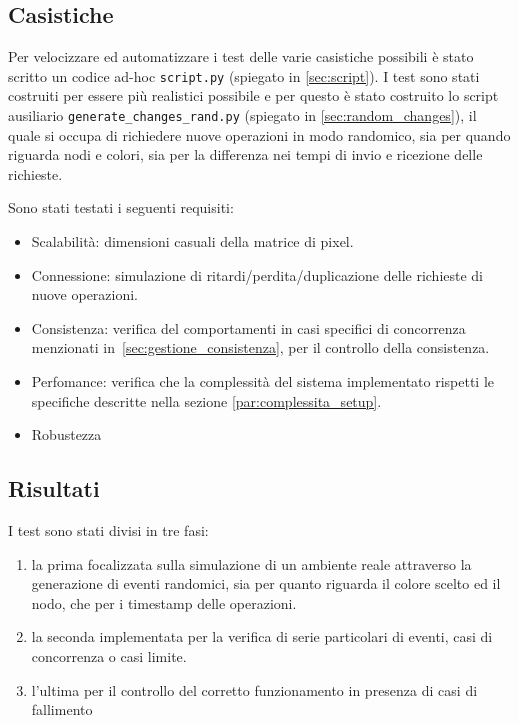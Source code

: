 \documentclass[12pt, a4paper]{report}
\begin{document}
\subsection{Casistiche}

Per velocizzare ed automatizzare i test delle varie casistiche possibili \`e stato scritto un codice ad-hoc \texttt{script.py} (spiegato in \ref{sec:script}). I test sono stati costruiti per essere pi\`u realistici possibile e per questo \`e stato costruito lo script ausiliario \texttt{generate\_changes\_rand.py} (spiegato in \ref{sec:random_changes}), il quale si occupa di richiedere nuove operazioni in modo randomico, sia per quando riguarda nodi e colori, sia per la differenza nei tempi di invio e ricezione delle richieste.

\newpage
Sono stati testati i seguenti requisiti:
\begin{itemize}
    \item Scalabilit\`a: dimensioni casuali della matrice di pixel.
    \item Connessione: simulazione di ritardi/perdita/duplicazione delle richieste di nuove operazioni.
    \item Consistenza: verifica del comportamenti in casi specifici di concorrenza menzionati in~\ref{sec:gestione_consistenza}, per il controllo della consistenza.
    \item Perfomance: verifica che la complessit\`a del sistema implementato rispetti le specifiche descritte nella sezione \ref{par:complessita_setup}.
    \item Robustezza
\end{itemize}

\subsection{Risultati}

I test sono stati divisi in tre fasi:
\begin{enumerate}
    \item la prima focalizzata sulla simulazione di un ambiente reale attraverso la generazione di eventi randomici, sia per quanto riguarda il colore scelto ed il nodo, che per i timestamp delle operazioni.
    \item la seconda implementata per la verifica di serie particolari di eventi, casi di concorrenza o casi limite.
    \item l'ultima per il controllo del corretto funzionamento in presenza di casi di fallimento
\end{enumerate} 
\end{document}
